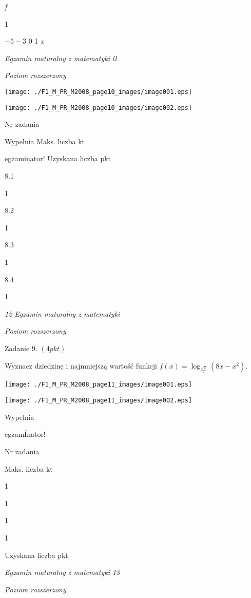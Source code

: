 \documentclass[a4paper,12pt]{article}
\begin{document}
{\it f}

1

$-5  -3$  0 1  {\it x}





{\it Egzamin maturalny z matematyki ll}

{\it Poziom rozszerzony}
\begin{center}
\texttt{[image: ./F1\_M\_PR\_M2008\_page10\_images/image001.eps]}

\texttt{[image: ./F1\_M\_PR\_M2008\_page10\_images/image002.eps]}
\end{center}
Nr zadania

Wypelnia Maks. liczba kt

egzaminator! Uzyskana liczba pkt

8.1

1

8.2

1

8.3

1

8.4

1





{\it 12 Egzamin maturalny z matematyki}

{\it Poziom rozszerzony}

Zadanie 9. $(4pkt)$

Wyznacz dziedzinę i najmniejszą wartość funkcji $f(x)=\log_{\frac{\sqrt{2}}{2}}(8x-x^{2}).$
\begin{center}
\texttt{[image: ./F1\_M\_PR\_M2008\_page11\_images/image001.eps]}

\texttt{[image: ./F1\_M\_PR\_M2008\_page11\_images/image002.eps]}
\end{center}
Wypelnia

egzamÍnator!

Nr zadania

Maks. liczba kt

1

1

1

1

Uzyskana liczba pkt





{\it Egzamin maturalny z matematyki 13}

{\it Poziom rozszerzony}
\end{document}
